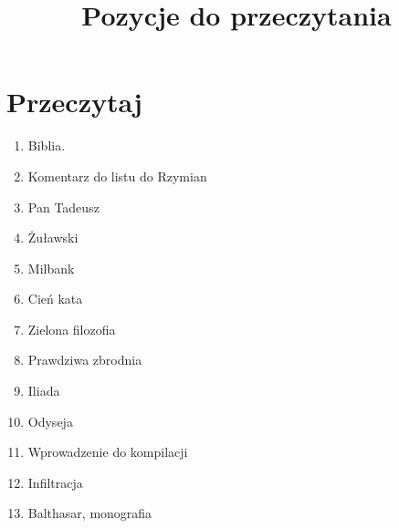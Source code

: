 \documentclass[a4paper,11pt]{article}
\title{Pozycje do przeczytania}
\begin{document}





\maketitle  %



\section{Przeczytaj}

\vspace{2em}


\begin{enumerate}

\item Biblia.

\item Komentarz do listu do Rzymian

\item Pan Tadeusz

\item Żuławski

\item Milbank

\item Cień kata

\item Zielona filozofia

\item Prawdziwa zbrodnia

\item Iliada

\item Odyseja

\item Wprowadzenie do kompilacji

\item Infiltracja

\item Balthasar, monografia






\end{enumerate}
\end{document}
